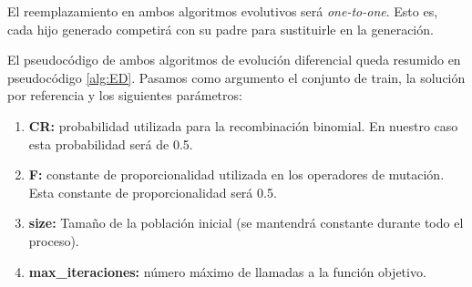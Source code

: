 	El reemplazamiento en ambos algoritmos evolutivos será \textit{one-to-one}. Esto es, cada hijo generado competirá con su padre para sustituirle en la generación. 
	
	El pseudocódigo de ambos algoritmos de evolución diferencial queda resumido en pseudocódigo \ref{alg:ED}. Pasamos como argumento el conjunto de train, la solución por referencia y los siguientes parámetros:
	
	\begin{enumerate}
		\item \textbf{CR: } probabilidad utilizada para la recombinación binomial. En nuestro caso esta probabilidad será de 0.5.
		\item \textbf{F: } constante de proporcionalidad utilizada en los operadores de mutación. Esta constante de proporcionalidad será 0.5.
		\item \textbf{size: } Tamaño de la población inicial (se mantendrá constante durante todo el proceso).
		\item \textbf{max\_iteraciones: } número máximo de llamadas a la función objetivo.
	\end{enumerate}


